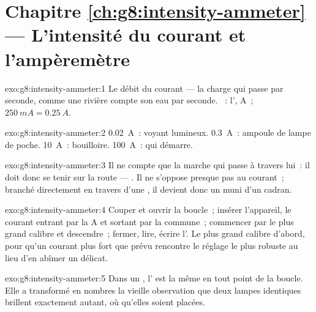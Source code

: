 \section*{Chapitre \ref{ch:g8:intensity-ammeter} --- L'intensité du courant et l'ampèremètre}

\begin{solution}{exo:g8:intensity-ammeter:1}
Le débit du courant --- la charge qui passe par seconde, comme une
rivière compte son eau par seconde. ~: l', \unit{A}~;
$\qty{250}{mA} = \qty{0.25}{A}$.
\end{solution}

\begin{solution}{exo:g8:intensity-ammeter:2}
\qty{0.02}{A}~: voyant lumineux. \qty{0.3}{A}~: ampoule de lampe de
poche. \qty{10}{A}~: bouilloire. \qty{100}{A}~:  qui démarre.
\end{solution}

\begin{solution}{exo:g8:intensity-ammeter:3}
Il ne compte que la marche qui passe à travers lui~: il doit donc se
tenir sur la route --- . Il ne s'oppose presque pas au
courant~; branché directement en travers d'une , il devient donc
un  muni d'un cadran.
\end{solution}

\begin{solution}{exo:g8:intensity-ammeter:4}
Couper et ouvrir la boucle~; insérer l'appareil, le courant entrant
par la  \unit{A} et sortant par la commune~; commencer par le
plus grand calibre et descendre~; fermer, lire, écrire l'. Le
plus grand calibre d'abord, pour qu'un courant plus fort que prévu
rencontre le réglage le plus robuste au lieu d'en abîmer un
délicat.
\end{solution}

\begin{solution}{exo:g8:intensity-ammeter:5}
Dans un , l' est la même en tout point de la
boucle. Elle a transformé en nombres la vieille observation que deux
lampes identiques  brillent exactement autant, où qu'elles
soient placées.
\end{solution}

